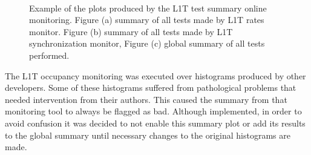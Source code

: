 \begin{figure}[!htp]%
\centering
{}\qquad
{}\\
\caption[Example of the plots produced by the L1T test summary online monitoring]
{Example of the plots produced by the \gls{L1T} test summary online monitoring. Figure (a) summary of all tests made by \gls{L1T} rates monitor. Figure (b) summary of all tests made by \gls{L1T} synchronization monitor, Figure (c) global summary of all tests performed.}
\label{FIGURE:TechnicalWork_TestsSummary}
\end{figure}

The \gls{L1T} occupancy monitoring was executed over histograms produced by other developers. Some of these histograms suffered from pathological problems that needed intervention from their authors. This caused the summary from that monitoring tool to always be flagged as bad. Although implemented, in order to avoid confusion it was decided to not enable this summary plot or add its results to the global summary until necessary changes to the original histograms are made.
